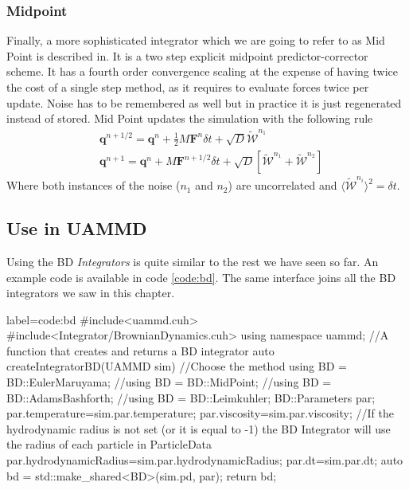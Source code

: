 \documentclass[ twoside,openright,titlepage,numbers=noenddot,%
headinclude,footinclude,cleardoublepage=empty,abstract=on,
BCOR=5mm,paper=a4,fontsize=11pt, dvipsnames
]{scrreprt}
\renewcommand{\vec}[1]{\bm{#1}}
\newcommand{\dt}{\delta t}
\newcommand{\half}{\frac{1}{2}}
\newcommand{\noise}{\widetilde{W}}
\newcommand{\ppos}{q}
\begin{document}
\subsubsection*{Midpoint}
Finally, a more sophisticated integrator which we are going to refer to as Mid Point is described in\cite{Delong2013}. 
It is a two step explicit midpoint predictor-corrector scheme. It has a fourth order convergence scaling at the expense of having twice the cost of a single step method, as it requires to evaluate forces twice per update. Noise has to be remembered as well but in practice it is just regenerated instead of stored.
Mid Point updates the simulation with the following rule
\begin{equation}
  \begin{aligned}
    &\vec{\ppos}^{n+1/2} = \vec{\ppos}^n + \half M\vec{F}^n\dt + \sqrt{D}\vec{\mathcal{\noise}}^{n_1}\\
    &\vec{\ppos}^{n+1} = \vec{\ppos}^n + M\vec{F}^{n+1/2}\dt + \sqrt{D}\left[\vec{\mathcal{\noise}}^{n_1}  + \vec{\mathcal{\noise}}^{n_2}\right]
  \end{aligned}
\end{equation}
Where both instances of the noise ($n_1$ and $n_2$) are uncorrelated and $\langle \mathcal{\noise}^{n_i}\rangle^2 = \dt$.
\subsection*{Use in UAMMD}
Using the \gls{BD} \emph{Integrators} is quite similar to the rest we have seen so far. An example code is available in code \ref{code:bd}. The same interface joins all the \gls{BD} integrators we saw in this chapter.
\begin{code2}{label=code:bd}
#include<uammd.cuh>
#include<Integrator/BrownianDynamics.cuh>
using namespace uammd;
//A function that creates and returns a BD integrator
auto createIntegratorBD(UAMMD sim){   
  //Choose the method
  using BD = BD::EulerMaruyama;
  //using BD = BD::MidPoint;
  //using BD = BD::AdamsBashforth;
  //using BD = BD::Leimkuhler;
  BD::Parameters par;
  par.temperature=sim.par.temperature;
  par.viscosity=sim.par.viscosity;
  //If the hydrodynamic radius is not set (or it is equal to -1) the BD Integrator will use the radius of each particle in ParticleData
  par.hydrodynamicRadius=sim.par.hydrodynamicRadius;
  par.dt=sim.par.dt;
  auto bd = std::make_shared<BD>(sim.pd, par);
  return bd;
}
\end{code2}
\end{document}
